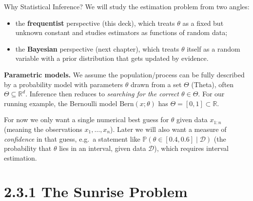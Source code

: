 \documentclass[aspectratio=169,10pt]{beamer}
\begin{document}
\begin{frame}[allowframebreaks]{Why Statistical Inference?}
  We will study the estimation problem from two angles:
  \begin{itemize}
    \item the \textbf{frequentist} perspective (this deck), which treats
      $\theta$ as a fixed but unknown constant and studies estimators as
      functions of random data;
    \item the \textbf{Bayesian} perspective (next chapter), which treats
      $\theta$ itself as a random variable with a prior distribution that
      gets updated by evidence.
  \end{itemize}

  \textbf{Parametric models.} We assume the population/process can be fully
  described by a probability model with parameters $\theta$ drawn from a set
  $\Theta$ (Theta), often $\Theta \subseteq \mathbb{R}^d$. Inference then
  reduces to \emph{searching for the correct $\theta \in \Theta$}. For our
  running example, the Bernoulli model $\mathrm{Bern}(x;\theta)$ has
  $\Theta = [0,1] \subset \mathbb{R}$.

  For now we only want a single numerical best guess for $\theta$ given data
  $x_{1:n}$ (meaning the observations $x_1,\dots,x_n$). Later we will also
  want a measure of \emph{confidence} in that guess, e.g.\ a statement like
  $\mathbb{P}(\theta \in [0.4,0.6] \mid \mathcal{D}) $ (the probability that
  $\theta$ lies in an interval, given data $\mathcal{D}$), which requires
  interval estimation.
\end{frame}

\section{2.3.1 The Sunrise Problem}
\end{document}
